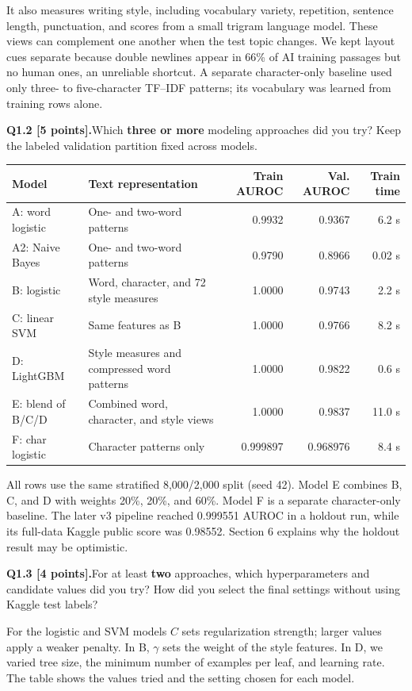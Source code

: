 \documentclass[11pt,letterpaper]{article}
\newcommand{\question}[2]{\needspace{4\baselineskip}\par\addvspace{0.45em}\noindent\textbf{#1}\quad #2\par\nobreak\vspace{0.1em}}
\begin{document}
It also measures writing style, including vocabulary variety, repetition, sentence length, punctuation, and scores from a small trigram language model. These views can complement one another when the test topic changes. We kept layout cues separate because double newlines appear in 66\% of AI training passages but no human ones, an unreliable shortcut. A separate character-only baseline used only three- to five-character TF--IDF patterns; its vocabulary was learned from training rows alone.
\question{Q1.2 [5 points].}{Which \textbf{three or more} modeling approaches did you try? Keep the labeled validation partition fixed across models.}
\begin{tabularx}{\linewidth}{@{}p{1.24in}Yrrr@{}}\toprule
Model & Text representation & Train AUROC & Val. AUROC & Train time \\ \midrule
A: word logistic & One- and two-word patterns & 0.9932 & 0.9367 & 6.2 s \\
A2: Naive Bayes & One- and two-word patterns & 0.9790 & 0.8966 & 0.02 s \\
B: logistic & Word, character, and 72 style measures & 1.0000 & 0.9743 & 2.2 s \\
C: linear SVM & Same features as B & 1.0000 & 0.9766 & 8.2 s \\
D: LightGBM & Style measures and compressed word patterns & 1.0000 & 0.9822 & 0.6 s \\
E: blend of B/C/D & Combined word, character, and style views & 1.0000 & 0.9837 & 11.0 s \\
F: char logistic & Character patterns only & 0.999897 & 0.968976 & 8.4 s \\
\bottomrule\end{tabularx}
All rows use the same stratified 8,000/2,000 split (seed 42). Model E combines B, C, and D with weights 20\%, 20\%, and 60\%. Model F is a separate character-only baseline. The later v3 pipeline reached 0.999551 AUROC in a holdout run, while its full-data Kaggle public score was 0.98552. Section 6 explains why the holdout result may be optimistic.
\question{Q1.3 [4 points].}{For at least \textbf{two} approaches, which hyperparameters and candidate values did you try? How did you select the final settings without using Kaggle test labels?}
For the logistic and SVM models $C$ sets regularization strength; larger values apply a weaker penalty. In B, $\gamma$ sets the weight of the style features. In D, we varied tree size, the minimum number of examples per leaf, and learning rate. The table shows the values tried and the setting chosen for each model.
\end{document}
